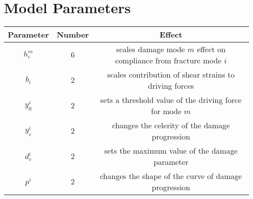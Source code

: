 \documentclass[11pt]{article}
\begin{document}
\section{Model Parameters}
\label{sec:org0ac2884}
\begin{table}[h!]
  \label{tab:OpenDM2Mode_ParamDef}
  \centering
  \begin{tabular}{c|c|c}
    Parameter & Number & Effect \\
    \hline
    $h_i^m$ & $6$ & scales damage mode $m$ effect on compliance from fracture mode $i$ \\
    $b_i$ & $2$ & scales contribution of shear strains to driving forces \\
    $y_0^i$ & $2$ & sets a threshold value of the driving force for mode $m$ \\ 
    $y_c^i$ & $2$ & changes the celerity of the damage progression \\
    $d_c^i$ & $2$ & sets the maximum value of the damage parameter \\
    $p^i$ & $2$ &changes the shape of the curve of damage progression \\
  \end{tabular}
\end{table}
\end{document}
